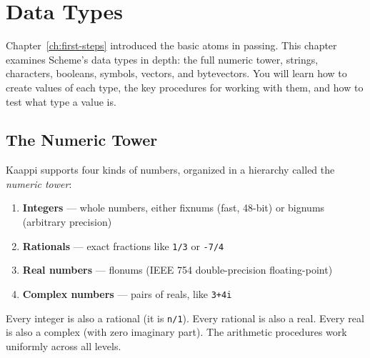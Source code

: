 \chapter{Data Types}
\label{ch:data-types}

Chapter~\ref{ch:first-steps} introduced the basic atoms in passing. This chapter examines Scheme's data types in depth: the full numeric tower, strings, characters, booleans, symbols, vectors, and bytevectors. You will learn how to create values of each type, the key procedures for working with them, and how to test what type a value is.

\section{The Numeric Tower}

Kaappi supports four kinds of numbers, organized in a hierarchy called the \emph{numeric tower}:

\begin{enumerate}
    \item \textbf{Integers} --- whole numbers, either fixnums (fast, 48-bit) or bignums (arbitrary precision)
    \item \textbf{Rationals} --- exact fractions like \texttt{1/3} or \texttt{-7/4}
    \item \textbf{Real numbers} --- flonums (IEEE 754 double-precision floating-point)
    \item \textbf{Complex numbers} --- pairs of reals, like \texttt{3+4i}
\end{enumerate}

Every integer is also a rational (it is \texttt{n/1}). Every rational is also a real. Every real is also a complex (with zero imaginary part). The arithmetic procedures work uniformly across all levels.

\begin{center}
\end{center}

